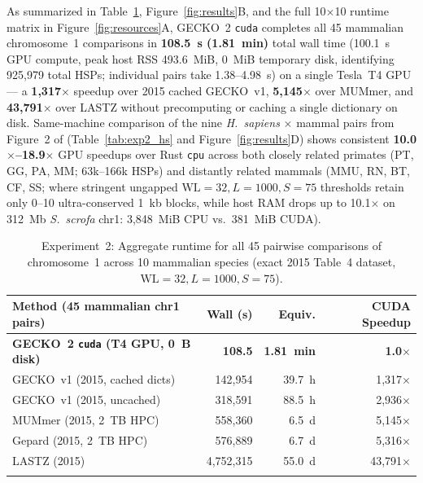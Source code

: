 \documentclass[pdflatex,sn-vancouver,Numbered]{sn-jnl}
\newcommand{\hlAllVsAllCudaMin}{1.81~min}
\newcommand{\eTwoCudaWall}{108.5}
\newcommand{\eTwoCudaComp}{100.1}
\newcommand{\eTwoCudaRss}{493.6}
\newcommand{\eTwoTotalFrags}{925,979}
\newcommand{\eTwoSpVoneCached}{1,317$\times$}
\newcommand{\eTwoSpVoneNocache}{2,936$\times$}
\newcommand{\eTwoSpMummer}{5,145$\times$}
\newcommand{\eTwoSpGepard}{5,316$\times$}
\newcommand{\eTwoSpLastz}{43,791$\times$}
\begin{document}
As summarized in Table~\ref{tab:exp2}, Figure~\ref{fig:results}B, and the full 10$\times$10 runtime matrix in Figure~\ref{fig:resources}A, GECKO~2 \texttt{cuda} completes all 45 mammalian chromosome~1 comparisons in \textbf{\eTwoCudaWall{}~s (\hlAllVsAllCudaMin{})} total wall time (\eTwoCudaComp{}~s GPU compute, peak host RSS \eTwoCudaRss{}~MiB, 0~MiB temporary disk, identifying \eTwoTotalFrags{} total HSPs; individual pairs take 1.38--4.98~s) on a single Tesla~T4 GPU --- a \textbf{\eTwoSpVoneCached{}} speedup over 2015 cached GECKO~v1, \textbf{\eTwoSpMummer{}} over MUMmer, and \textbf{\eTwoSpLastz{}} over LASTZ without precomputing or caching a single dictionary on disk. Same-machine comparison of the nine \textit{H.~sapiens} $\times$ mammal pairs from Figure~2 of \cite{torreno2015gecko} (Table~\ref{tab:exp2_hs} and Figure~\ref{fig:results}D) shows consistent \textbf{10.0$\times$--18.9$\times$} GPU speedups over Rust \texttt{cpu} across both closely related primates (PT, GG, PA, MM; 63k--166k HSPs) and distantly related mammals (MMU, RN, BT, CF, SS; where stringent ungapped $\text{WL}=32, L=1000, S=75$ thresholds retain only 0--10 ultra-conserved 1~kb blocks, while host RAM drops up to 10.1$\times$ on 312~Mb \textit{S.~scrofa} chr1: 3,848~MiB CPU vs.\ 381~MiB CUDA).

\begin{table}[ht]
\centering
\footnotesize
\setlength{\tabcolsep}{3.5pt}
\caption{Experiment~2: Aggregate runtime for all 45 pairwise comparisons of chromosome~1 across 10 mammalian species (exact 2015 Table~4 dataset, $\text{WL}=32, L=1000, S=75$).}\label{tab:exp2}
\begin{tabular*}{\textwidth}{@{\extracolsep\fill}lrrr}
\toprule
Method (45 mammalian chr1 pairs) & Wall (s) & Equiv. & CUDA Speedup \\
\midrule
\textbf{GECKO~2 \texttt{cuda} (T4 GPU, 0~B disk)} & \textbf{\eTwoCudaWall} & \textbf{\hlAllVsAllCudaMin} & \textbf{1.0$\times$} \\
GECKO~v1 (2015, cached dicts) \cite{torreno2015gecko} & 142,954 & 39.7~h & \eTwoSpVoneCached \\
GECKO~v1 (2015, uncached) \cite{torreno2015gecko} & 318,591 & 88.5~h & \eTwoSpVoneNocache \\
MUMmer (2015, 2~TB HPC) \cite{torreno2015gecko} & 558,360 & 6.5~d & \eTwoSpMummer \\
Gepard (2015, 2~TB HPC) \cite{torreno2015gecko} & 576,889 & 6.7~d & \eTwoSpGepard \\
LASTZ (2015) \cite{torreno2015gecko} & 4,752,315 & 55.0~d & \eTwoSpLastz \\
\botrule
\end{tabular*}
\end{table}
\end{document}
